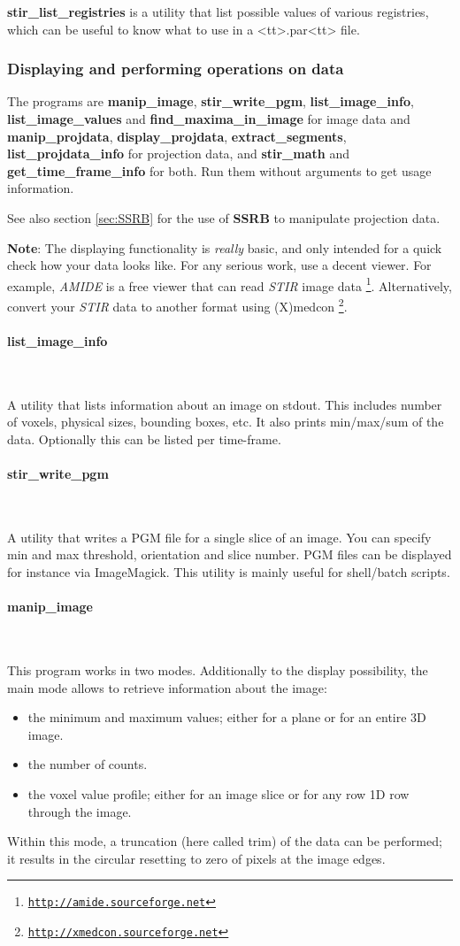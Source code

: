 \documentclass{article}
\def\url#1#2{\mbox{\href{#1}{\tt #2}}}
\newcommand{\subsubsubsection}[1]{\paragraph{#1}\mbox{} \\}
\begin{document}
\textbf{stir\_list\_registries} is a utility that list possible values of various
registries, which can be useful to know what to use in a <tt>.par<tt> file.

\subsubsection{
Displaying and performing operations on data}

The programs are \textbf{manip\_image}, \textbf{stir\_write\_pgm}, \textbf{list\_image\_info}, 
\textbf{list\_image\_values} and \textbf{find\_maxima\_in\_image}
for image data and \textbf{manip\_projdata}, 
 \textbf{display\_projdata}, \textbf{extract\_segments}, 
\textbf{list\_projdata\_info} for 
projection data, and \textbf{stir\_math} and \textbf{get\_time\_frame\_info} for both.
Run them without arguments to get usage information.

See also section \ref{sec:SSRB} for the use of \textbf{SSRB} to manipulate projection 
data.

\textbf{Note}: The displaying functionality is \textit{really} basic, and 
only intended for a quick check how your data looks like. For 
any serious work, use a decent viewer. For example, \textit{AMIDE} 
is a free viewer that can read \textit{STIR} image data
\footnote{\url{http://amide.sourceforge.net }{http://amide.sourceforge.net}}. Alternatively, 
convert your \textit{STIR} data to another format using (X)medcon
\footnote{\url{http://xmedcon.sourceforge.net }{http://xmedcon.sourceforge.net}}.

{ \subsubsubsection{list\_image\_info}
}

A utility that lists information about an image on stdout. This includes number of voxels,
physical sizes, bounding boxes, etc. It also prints min/max/sum of the data. 
Optionally this can be listed per time-frame.

{ \subsubsubsection{stir\_write\_pgm}
}

A utility that writes a PGM file for a single slice of an image. You can specify min and max threshold,
orientation and slice number. PGM files can be displayed for instance via ImageMagick.
This utility is mainly useful for shell/batch scripts.

{ \subsubsubsection{manip\_image}
}

This program works in two modes. Additionally to the display 
possibility, the main mode allows to retrieve information about 
the image:

\begin{itemize}
\item the minimum and maximum values; either for a plane or for an 
entire 3D image.
\item the number of counts.
\item the voxel value profile; either for an image slice or for any 
row 1D row through the image.
\end{itemize}
Within this mode, a truncation (here called trim) of the data 
can be performed; it results in the circular resetting to zero 
of pixels at the image edges.
\end{document}
